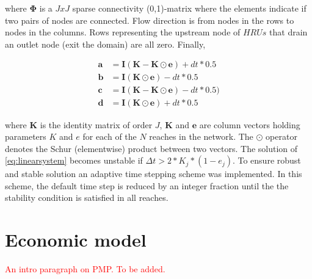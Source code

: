 \documentclass[review]{elsarticle}
\begin{document}
where $\mathbf{\Phi}$ is a $JxJ$ sparse connectivity (0,1)-matrix where the elements indicate if two pairs of nodes are connected. Flow direction is from nodes in the rows to nodes in the columns. Rows representing the upstream node of $HRUs$ that drain an outlet node (exit the domain) are all zero. Finally,


\begin{align}
\mathbf{a} &= \mathbf{I} (\mathbf{K}-\mathbf{K\odot e}) + dt * 0.5\\
\mathbf{b} &= \mathbf{I} (\mathbf{K\odot e}) - dt * 0.5\\
\mathbf{c} &= \mathbf{I} (\mathbf{K}-\mathbf{K\odot e}) - dt * 0.5)\\
\mathbf{d} &= \mathbf{I} (\mathbf{K\odot e}) + dt * 0.5
\end{align}

\noindent where $\mathbf{K}$ is the identity matrix of order $J$, $\mathbf{K}$ and $\mathbf{e}$ are column vectors holding parameters $K$ and $e$ for each of the $N$ reaches in the network. The $\odot$ operator denotes the Schur (elementwise) product between two vectors.
The solution of \eqref{eq:linearsystem} becomes unstable if $\Delta t > 2 * K_j * (1 - e_j)$. To ensure robust and stable solution an adaptive time stepping scheme was implemented. In this scheme, the default time step is reduced by an integer fraction until the the stability condition is satisfied in all reaches. 


\section{Economic model}
\textcolor{red}{An intro paragraph on PMP. To be added.}
\end{document}
